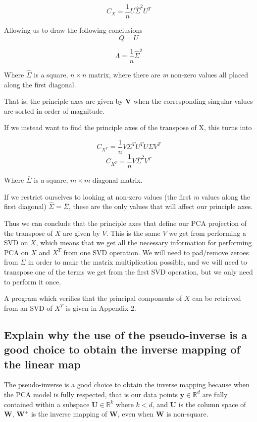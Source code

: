 \documentclass[11pt,a4paper,landscape]{article}
\begin{document}
$$ C_{X} = \frac{1}{n} U \widehat{\Sigma}^{2} U^{T}  $$

Allowing us to draw the following conclusions
$$ Q = U $$

$$ \Lambda =  \frac{1}{n} \widehat{\Sigma}^{2}$$

Where $\widehat{\Sigma}$ is a square, $n \times n$ matrix, where there are \textit{m} non-zero values all placed along the first diagonal.\newline

That is, the principle axes are given by \textbf{V} when the corresponding singular values are sorted in order of magnitude.

If we instead want to find the principle axes of the transpose of X, this turns into

$$ C_{X^{T}} = \frac{1}{n} V \Sigma^{T} U^{T} U\Sigma V^{T}  $$
$$ C_{X^{T}} = \frac{1}{n} V \overline{\Sigma}^{2} V^{T}  $$

Where $\overline{\Sigma}$ is a square, $m \times m$ diagonal matrix.\newline

If we restrict ourselves to looking at non-zero values (the first \textit{m} values along the first diagonal) $\widehat{\Sigma} = \overline{\Sigma} $, these are the only values that will affect our principle axes.\newline

Thus we can conclude that the principle axes that define our PCA projection of the transpose of $X$ are given by $V$. This is the same $V$ we get from performing a SVD on $X$, which means that we get all the necessary information for performing PCA on $X$ and $X^{T}$ from one SVD operation. We will  need to pad/remove zeroes from $\Sigma$ in order to make the matrix multiplication possible, and we will need to transpose one of the terms we get from the first SVD operation,  but we only need to perform it once.\newline

A program which verifies that the principal components of $X$ can be retrieved from an SVD of $X^{T}$ is given in Appendix 2.

\subsection{Explain why the use of the pseudo-inverse is a good choice to obtain the inverse mapping of the linear map}

The pseudo-inverse is a good choice to obtain the inverse mapping because when the PCA model is fully respected, that is our data points $\textbf{y} \in \mathbb{R}^d$ are fully contained within a subspace $\textbf{U} \in \mathbb{R}^k$ where $k < d$, and \textbf{U} is the column space of \textbf{W}, $\textbf{W}^{+}$ is the inverse mapping of \textbf{W}, even when \textbf{W} is non-square.\newline
\end{document}
